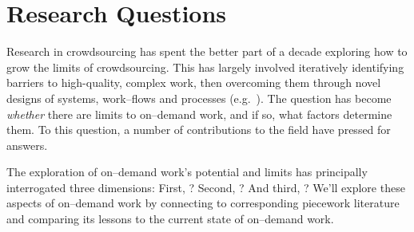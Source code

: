 \documentclass[trackingWork]{subfiles}
\begin{document}
\section{Research Questions}

{Research in crowdsourcing has spent the better part of a decade
exploring how to grow the limits of crowdsourcing.}
This has largely involved iteratively
identifying barriers to high-quality, complex work, then
overcoming them through novel designs of systems, work--flows and processes (e.g.~\cite{bernsteinSoylent,foundry,crowdForgeKittur}).
The question 
has become \textit{whether} there are limits to on--demand work,
and if so, what factors determine them.
To this question, a number of contributions to the field have pressed for answers.

The exploration of on--demand work's potential and limits has principally 
interrogated three dimensions:
First, ?
Second, ?
And third, ?
We'll explore these aspects of on--demand work by connecting to corresponding piecework literature
and comparing its lessons to the current state of on--demand work.


\notinsubfile{
  
  
  
}
\onlyinsubfile{
  \printbibliography{}
}
\end{document}
